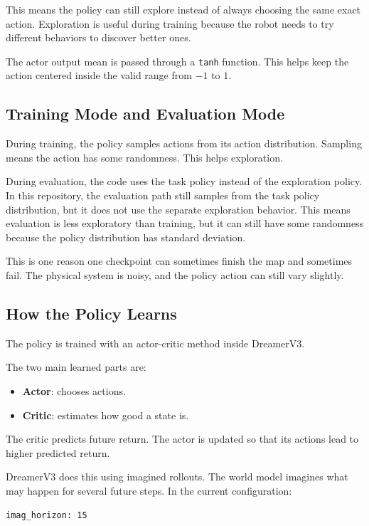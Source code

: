 \documentclass[11pt]{article}
\begin{document}
This means the policy can still explore instead of always choosing the same exact action. Exploration is useful during training because the robot needs to try different behaviors to discover better ones.

The actor output mean is passed through a \texttt{tanh} function. This helps keep the action centered inside the valid range from $-1$ to $1$.

\subsection{Training Mode and Evaluation Mode}

During training, the policy samples actions from its action distribution. Sampling means the action has some randomness. This helps exploration.

During evaluation, the code uses the task policy instead of the exploration policy. In this repository, the evaluation path still samples from the task policy distribution, but it does not use the separate exploration behavior. This means evaluation is less exploratory than training, but it can still have some randomness because the policy distribution has standard deviation.

This is one reason one checkpoint can sometimes finish the map and sometimes fail. The physical system is noisy, and the policy action can still vary slightly.

\subsection{How the Policy Learns}

The policy is trained with an actor-critic method inside DreamerV3.

The two main learned parts are:

\begin{itemize}[leftmargin=*]
  \item \textbf{Actor}: chooses actions.
  \item \textbf{Critic}: estimates how good a state is.
\end{itemize}

The critic predicts future return. The actor is updated so that its actions lead to higher predicted return.

DreamerV3 does this using imagined rollouts. The world model imagines what may happen for several future steps. In the current configuration:

\begin{lstlisting}
imag_horizon: 15
\end{lstlisting}
\end{document}
